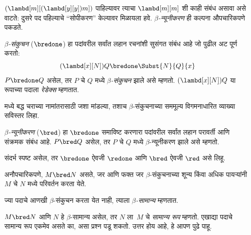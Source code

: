 \documentclass[../../../include/open-logic-section]{subfiles}
\begin{document}

$(\lambd[m][(\lambd[y][y]) m])$ पाहिल्यावर त्याचा
$\lambd[m][m]$ शी काही संबंध असावा असे वाटते:
दुसरे पद पहिल्याचे ``सोपीकरण'' केल्यावर मिळायला हवे.
\emph{$\beta$-न्यूनीकरण} ही कल्पना औपचारिकपणे पकडते.

\begin{defn} 
  \emph{$\beta$-संकुचन} ($\bredone$) हा पदांवरील
  सर्वांत लहान रचनांशी सुसंगत संबंध आहे जो पुढील अट पूर्ण करतो:
  \[
    (\lambd[x][N])Q \bredone \Subst{N}{Q}{x}
  \]
  $P \bredone Q$ असेल, तर $P$ चे $Q$ मध्ये
  \emph{$\beta$-संकुचन} झाले असे म्हणतो.
  $(\lambd[x][N])Q$ या रूपाच्या पदाला \emph{रेडेक्स} म्हणतात.
\end{defn}

\begin{prob} 
   मध्ये बद्ध चराच्या
  नामांतरासाठी जशा मांडल्या, तशाच $\beta$-संकुचनाच्या
  सममूल्य विगमनाधारित व्याख्या सविस्तर लिहा.
\end{prob}

\begin{defn} 
  \emph{$\beta$-न्यूनीकरण} ($\bred$) हा $\bredone$
  समाविष्ट करणारा पदांवरील सर्वांत लहान परावर्ती आणि
  संक्रमक संबंध आहे. $P \bred Q$ असेल, तर $P$ चे
  $Q$ मध्ये $\beta$-न्यूनीकरण झाले असे म्हणतो.
\end{defn}

संदर्भ स्पष्ट असेल, तर $\bredone$ ऐवजी $\redone$
आणि $\bred$ ऐवजी $\red$ असे लिहू.

अनौपचारिकपणे, $M \bred N$ असते, जर आणि फक्त जर
$\beta$-संकुचनाच्या शून्य किंवा अधिक पायऱ्यांनी
$M$ चे $N$ मध्ये परिवर्तन करता येते.

\begin{defn}[$\beta$-सामान्य]
ज्या पदाचे आणखी $\beta$-संकुचन करता येत नाही,
त्याला \emph{$\beta$-सामान्य} म्हणतात.
\end{defn}

$M \bred N$ आणि $N$ हे $\beta$-सामान्य असेल, तर
$N$ ला~$M$ चे \emph{सामान्य रूप} म्हणतो. एखाद्या पदाचे
सामान्य रूप एकमेव असते का, असा प्रश्न पडू शकतो.
उत्तर होय आहे, हे आपण पुढे पाहू.
\end{document}
